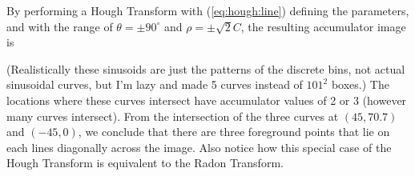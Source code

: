 By performing a Hough Transform with (\ref{eq:hough:line}) defining the parameters, and with the range of $\theta = \pm 90 ^{\circ}$ and $\rho = \pm \sqrt{2}C$, the resulting accumulator image is
\begin{center}
\end{center}
(Realistically these sinusoids are just the patterns of the discrete bins, not actual sinusoidal curves, but I'm lazy and made 5 curves instead of $101^2$ boxes.) The locations where these curves intersect have accumulator values of 2 or 3 (however many curves intersect). From the intersection of the three curves at $(45, 70.7)$ and $(-45, 0)$, we conclude that there are three foreground points that lie on each lines diagonally across the image. Also notice how this special case of the Hough Transform is equivalent to the Radon Transform.